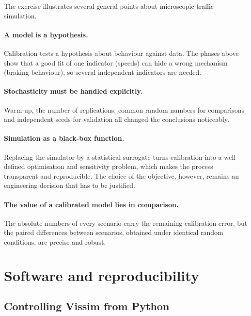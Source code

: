 \documentclass[11pt,a4paper]{article}
\begin{document}
The exercise illustrates several general points about microscopic traffic simulation.

\paragraph{A model is a hypothesis.} Calibration tests a hypothesis about behaviour against data.
The phases above show that a good fit of one indicator (speeds) can hide a wrong mechanism (braking
behaviour), so several independent indicators are needed.

\paragraph{Stochasticity must be handled explicitly.} Warm-up, the number of replications, common
random numbers for comparisons and independent seeds for validation all changed the conclusions
noticeably.

\paragraph{Simulation as a black-box function.} Replacing the simulator by a statistical surrogate
turns calibration into a well-defined optimisation and sensitivity problem, which makes the process
transparent and reproducible. The choice of the objective, however, remains an engineering decision
that has to be justified.

\paragraph{The value of a calibrated model lies in comparison.} The absolute numbers of every
scenario carry the remaining calibration error, but the paired differences between scenarios,
obtained under identical random conditions, are precise and robust.

\appendix
\section{Software and reproducibility}
\label{app:software}

\subsection{Controlling Vissim from Python}
\end{document}
